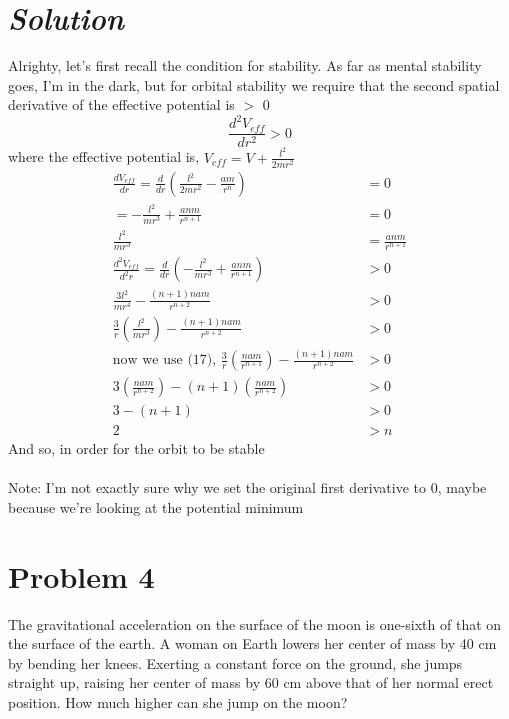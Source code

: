 \documentclass{article}
\begin{document}
\section*{\textit{Solution}} 
Alrighty, let's first recall the condition for stability. As far as mental stability goes, I'm in the dark, but for orbital stability we require that the second spatial derivative of the effective potential is $>$ 0
\[ \frac{d^2V_{eff}}{dr^2} > 0\]
where the effective potential is, $V_{eff} = V + \frac{l^2}{2mr^2}$
\begin{align}
	\frac{dV_{eff}}{dr} = \frac{d}{dr}\left(\frac{l^2}{2mr^2} - \frac{am}{r^n}\right) &= 0 \\ 
	= -\frac{l^2}{mr^3} + \frac{anm}{r^{n+1}} &= 0 \\ 
	\frac{l^2}{mr^3} &= \frac{anm}{r^{n+1}} \\ 
	\frac{d^2V_{eff}}{d^2r} = \frac{d}{dr}\left( -\frac{l^2}{mr^3} + \frac{anm}{r^{n+1}}\right) &> 0 \\
	\frac{3l^2}{mr^4} - \frac{(n+1)nam}{r^{n+2}} &> 0 \\ 
	\frac{3}{r} \left(\frac{l^2}{mr^3}\right) - \frac{(n+1)nam}{r^{n+2}} &> 0 \\
	\text{now we use (17), } \frac{3}{r} \left(\frac{nam}{r^{n+1}}\right) - \frac{(n+1)nam}{r^{n+2}} &> 0 \\
	3 \left(\frac{nam}{r^{n+2}}\right) - (n+1) \left( \frac{nam}{r^{n+2}} \right) &> 0 \\
	3 - (n+1) &> 0 \\
	2 &> n
\end{align}
And so,  in order for the orbit to be stable \\
\\
Note: I'm not exactly sure why we set the original first derivative to 0, maybe because we're looking at the potential minimum

\section*{Problem 4} 
The gravitational acceleration on the surface of the moon is one-sixth of that on the surface of the earth. A woman on Earth lowers her center of mass by 40 cm by bending her knees. Exerting a constant force on the ground, she jumps straight up, raising her center of mass by 60 cm above that of her normal erect position. How much higher can she jump on the moon?
\end{document}
